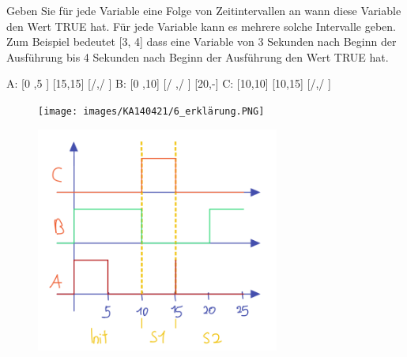 Geben Sie für jede Variable eine Folge von Zeitintervallen an wann diese Variable den Wert TRUE hat. Für
jede Variable kann es mehrere solche Intervalle geben. Zum Beispiel bedeutet [3, 4] dass eine Variable von
3 Sekunden nach Beginn der Ausführung bis 4 Sekunden nach Beginn der Ausführung den Wert TRUE hat.

A: [0 ,5 ] [15,15] [/,/ ]
B: [0 ,10] [/ ,/ ] [20,-]
C: [10,10] [10,15] [/,/ ]

\begin{figure}[H]
  \texttt{[image: images/KA140421/6\_erklärung.PNG]}
  \centering
\end{figure}

\begin{figure}[H]
  \includegraphics[width=8cm]{images/KA140421/6a_2.PNG}
  \centering
\end{figure}